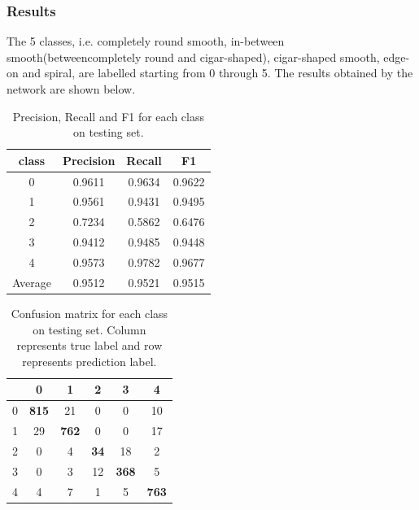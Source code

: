 \documentclass[a4paper,12pt]{report}
\begin{document}
\subsubsection{Results}
\hspace*{0.5 in}The 5 classes, i.e.  completely round smooth, in-between smooth(betweencompletely  round  and  cigar-shaped),  cigar-shaped  smooth,  edge-on  and  spiral, are labelled starting from 0 through 5. The results obtained by the network are shown below.
\begin{table}[H]
    \centering
    \begin{tabular}{c c c c}
    \hline
    \hline
        class & Precision & Recall & F1\\
    \hline
        0 & 0.9611 & 0.9634 & 0.9622\\
        1 & 0.9561 & 0.9431 & 0.9495\\
        2 & 0.7234 & 0.5862 & 0.6476\\
        3 & 0.9412 & 0.9485 & 0.9448\\
        4 & 0.9573 & 0.9782 & 0.9677\\
        Average & 0.9512 & 0.9521 & 0.9515\\
    \hline
    \end{tabular}
    \caption{Precision, Recall and F1 for each class on testing set.}
    \label{ResultaDai}
\end{table}
\begin{table}[H]
    \centering
    \begin{tabular}{c|c c c c c}
        \hline
        & 0 & 1 & 2 & 3 & 4\\
        \hline
        0 & \textbf{815} & 21 & 0 & 0 & 10\\
        1 & 29 & \textbf{762} & 0 & 0 & 17\\
        2 & 0 & 4 & \textbf{34} & 18 & 2\\
        3 & 0 & 3 & 12 & \textbf{368} & 5\\
        4 & 4 & 7 & 1 & 5 & \textbf{763}\\
        \hline
    \end{tabular}
    \caption{Confusion matrix for each class on testing set. Column represents true label and row represents prediction label.}
    \label{confusionmatrix}
\end{table}
\end{document}
